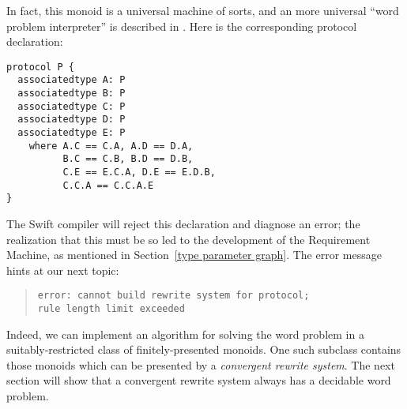 \documentclass[../generics]{subfiles}
\begin{document}
In fact, this monoid is a universal machine of sorts, and an more universal ``word problem interpreter'' is described in \cite{universalsemigroup}. Here is the corresponding protocol declaration:
\begin{Verbatim}
protocol P {
  associatedtype A: P
  associatedtype B: P
  associatedtype C: P
  associatedtype D: P
  associatedtype E: P
    where A.C == C.A, A.D == D.A,
          B.C == C.B, B.D == D.B,
          C.E == E.C.A, D.E == E.D.B,
          C.C.A == C.C.A.E
}
\end{Verbatim}
The Swift compiler will reject this declaration and diagnose an error; the realization that this must be so led to the development of the Requirement Machine, as mentioned in Section~\ref{type parameter graph}. The error message hints at our next topic:
\begin{quote}
\begin{verbatim}
error: cannot build rewrite system for protocol;
rule length limit exceeded
\end{verbatim}
\end{quote}
Indeed, we can implement an algorithm for solving the word problem in a suitably-restricted class of finitely-presented monoids. One such subclass contains those monoids which can be presented by a \emph{convergent rewrite system}. The next section will show that a convergent rewrite system always has a decidable word problem.
\end{document}
